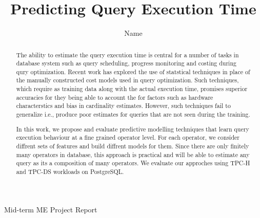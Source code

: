 \documentclass{article}
\title{\large \bf Predicting Query Execution Time }
\author{Name}
\date{}
\begin{document}
	\maketitle
    \begin{center}
        Mid-term ME Project Report
    \end{center}
        \vskip 12pt
	\thispagestyle{empty}
	
		\begin{abstract}
		The ability to estimate the query execution time is central for a number of tasks in database system
		such as query scheduling, progress monitoring and costing during qury optimization. Recent work 
		has explored the use of statstical techniques in place of the manually constructed cost models used 
		in query optimization. Such techniques, which require as training data along with the 
		actual execution time, promises superior accuracies for they being able to account the for factors 
		such as hardware characterstics and bias in cardinality estimates. However, such techniques fail 
		to generalize i.e., produce poor estimates for queries that are not seen during the training.
		
		In this work, we propose and evaluate predictive modelling techniques that learn query 
		execution behaviour at a fine grained operator level. For each operator, we consider diffrent sets 
		of features and build diffrent models for them. Since there are only finitely many operators in 
		database, this approach is practical and will be able to estimate any query as its a composition of
		many operators. We evaluate our approches using TPC-H and TPC-DS workloads on PostgreSQL.

	\end{abstract}	
	
	\hfill \\
	
\end{document}
